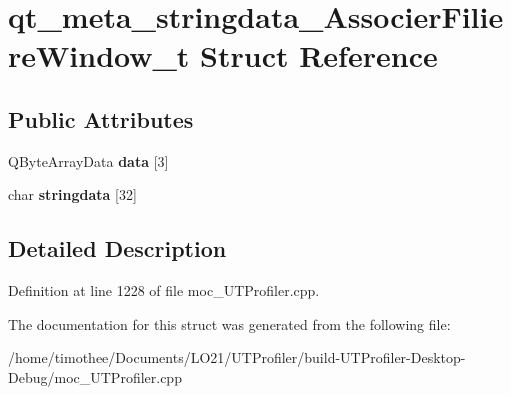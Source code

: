 \hypertarget{structqt__meta__stringdata___associer_filiere_window__t}{\section{qt\-\_\-meta\-\_\-stringdata\-\_\-\-Associer\-Filiere\-Window\-\_\-t Struct Reference}
\label{structqt__meta__stringdata___associer_filiere_window__t}
}
\subsection*{Public Attributes}
\begin{DoxyCompactItemize}
\item 
\hypertarget{structqt__meta__stringdata___associer_filiere_window__t_aebfac119d9c30de5c8bf598a450c7a48}{Q\-Byte\-Array\-Data {\bfseries data} \mbox{[}3\mbox{]}}\label{structqt__meta__stringdata___associer_filiere_window__t_aebfac119d9c30de5c8bf598a450c7a48}

\item 
\hypertarget{structqt__meta__stringdata___associer_filiere_window__t_a26f17e8c3d42905adf900756edcb0e2e}{char {\bfseries stringdata} \mbox{[}32\mbox{]}}\label{structqt__meta__stringdata___associer_filiere_window__t_a26f17e8c3d42905adf900756edcb0e2e}

\end{DoxyCompactItemize}


\subsection{Detailed Description}


Definition at line 1228 of file moc\-\_\-\-U\-T\-Profiler.\-cpp.



The documentation for this struct was generated from the following file\-:\begin{DoxyCompactItemize}
\item 
/home/timothee/\-Documents/\-L\-O21/\-U\-T\-Profiler/build-\/\-U\-T\-Profiler-\/\-Desktop-\/\-Debug/moc\-\_\-\-U\-T\-Profiler.\-cpp\end{DoxyCompactItemize}
